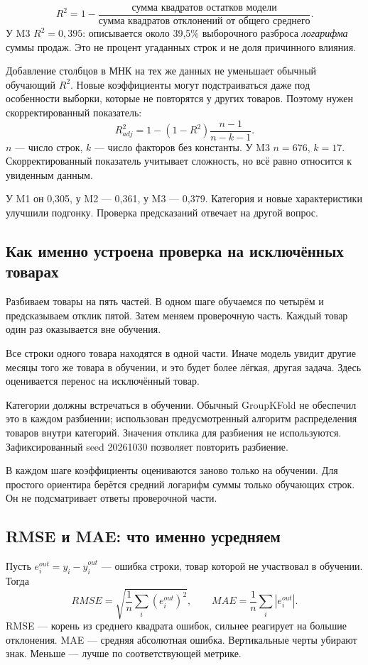 \documentclass[12pt,a4paper]{article}
\begin{document}
\[
 R^2=1-\frac{\text{сумма квадратов остатков модели}}
 {\text{сумма квадратов отклонений от общего среднего}}.
\]
У M3 $R^2=0{,}395$: описывается около 39,5\% выборочного разброса \emph{логарифма} суммы продаж. Это не процент угаданных строк и не доля причинного влияния.

Добавление столбцов в МНК на тех же данных не уменьшает обычный обучающий $R^2$. Новые коэффициенты могут подстраиваться даже под особенности выборки, которые не повторятся у других товаров. Поэтому нужен скорректированный показатель:
\[
 R^2_{adj}=1-(1-R^2)\frac{n-1}{n-k-1}.
\]
$n$ --- число строк, $k$ --- число факторов без константы. У M3 $n=676$, $k=17$. Скорректированный показатель учитывает сложность, но всё равно относится к увиденным данным.

У M1 он 0,305, у M2 --- 0,361, у M3 --- 0,379. Категория и новые характеристики улучшили подгонку. Проверка предсказаний отвечает на другой вопрос.

\subsection{Как именно устроена проверка на исключённых товарах}

Разбиваем товары на пять частей. В одном шаге обучаемся по четырём и предсказываем отклик пятой. Затем меняем проверочную часть. Каждый товар один раз оказывается вне обучения.

Все строки одного товара находятся в одной части. Иначе модель увидит другие месяцы того же товара в обучении, и это будет более лёгкая, другая задача. Здесь оценивается перенос на исключённый товар.

Категории должны встречаться в обучении. Обычный GroupKFold не обеспечил это в каждом разбиении; использован предусмотренный алгоритм распределения товаров внутри категорий. Значения отклика для разбиения не используются. Зафиксированный seed 20261030 позволяет повторить разбиение.

В каждом шаге коэффициенты оцениваются заново только на обучении. Для простого ориентира берётся средний логарифм суммы только обучающих строк. Он не подсматривает ответы проверочной части.

\subsection{RMSE и MAE: что именно усредняем}

Пусть $e_i^{out}=y_i-\widehat y_i^{out}$ --- ошибка строки, товар которой не участвовал в обучении. Тогда
\[
 RMSE=\sqrt{\frac1n\sum_i(e_i^{out})^2},\qquad
 MAE=\frac1n\sum_i|e_i^{out}|.
\]
RMSE --- корень из среднего квадрата ошибок, сильнее реагирует на большие отклонения. MAE --- средняя абсолютная ошибка. Вертикальные черты убирают знак. Меньше --- лучше по соответствующей метрике.
\end{document}

